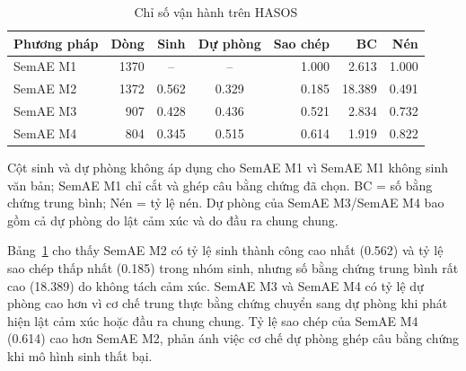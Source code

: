 \begin{table}[tbp]
\centering
\caption{Chỉ số vận hành trên HASOS}
\label{tab:production-ops}
\begin{threeparttable}
\begin{tabular}{l r c c r r r}
\toprule
\textbf{Phương pháp} & \textbf{Dòng} & \textbf{Sinh} & \textbf{Dự phòng} & \textbf{Sao chép} & \textbf{BC} & \textbf{Nén} \\
\midrule
SemAE M1 & 1370 & -- & -- & \num{1.000} & \num{2.613} & \num{1.000} \\
SemAE M2 & 1372 & \num{0.562} & \num{0.329} & \num{0.185} & \num{18.389} & \num{0.491} \\
SemAE M3 &  907 & \num{0.428} & \num{0.436} & \num{0.521} & \num{2.834} & \num{0.732} \\
SemAE M4 &  804 & \num{0.345} & \num{0.515} & \num{0.614} & \num{1.919} & \num{0.822} \\
\bottomrule
\end{tabular}
\begin{tablenotes}
\footnotesize
\item Cột sinh và dự phòng không áp dụng cho SemAE M1 vì SemAE M1 không sinh văn bản; SemAE M1 chỉ cắt và ghép câu bằng chứng đã chọn. BC = số bằng chứng trung bình; Nén = tỷ lệ nén. Dự phòng của SemAE M3/SemAE M4 bao gồm cả dự phòng do lật cảm xúc và do đầu ra chung chung.
\end{tablenotes}
\end{threeparttable}
\end{table}

Bảng~\ref{tab:production-ops} cho thấy SemAE M2 có tỷ lệ sinh thành công cao nhất (\num{0.562}) và tỷ lệ sao chép thấp nhất (\num{0.185}) trong nhóm sinh, nhưng số bằng chứng trung bình rất cao (\num{18.389}) do không tách cảm xúc. SemAE M3 và SemAE M4 có tỷ lệ dự phòng cao hơn vì cơ chế trung thực bằng chứng chuyển sang dự phòng khi phát hiện lật cảm xúc hoặc đầu ra chung chung. Tỷ lệ sao chép của SemAE M4 (\num{0.614}) cao hơn SemAE M2, phản ánh việc cơ chế dự phòng ghép câu bằng chứng khi mô hình sinh thất bại.

